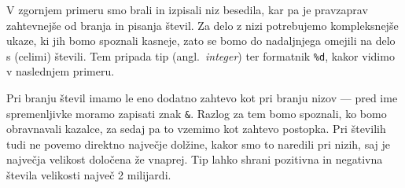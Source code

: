 V zgornjem primeru smo brali in izpisali niz besedila, kar pa je pravzaprav
zahtevnejše od branja in pisanja števil.
Za delo z nizi potrebujemo kompleksnejše ukaze, ki jih bomo spoznali kasneje,
zato se bomo do nadaljnjega omejili na delo s (celimi) števili.
Tem pripada tip  (angl.~\textit{integer}) ter formatnik \verb+%d+,
kakor vidimo v naslednjem primeru.


Pri branju števil imamo le eno dodatno zahtevo kot pri branju nizov --- pred ime
spremenljivke moramo zapisati znak \verb+&+.
Razlog za tem bomo spoznali, ko bomo obravnavali kazalce, za sedaj pa to vzemimo
kot zahtevo postopka.
Pri številih tudi ne povemo direktno največje dolžine, kakor smo to naredili pri
nizih, saj je največja velikost določena že vnaprej.
Tip  lahko shrani pozitivna in negativna števila velikosti največ 2
milijardi.

